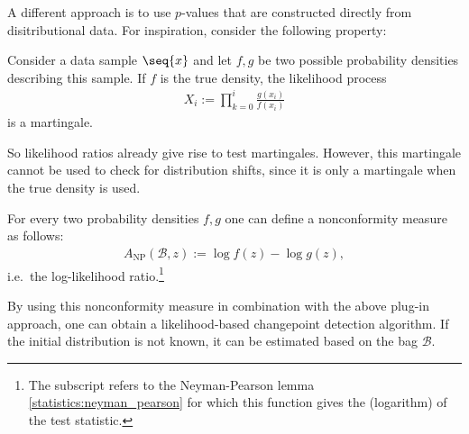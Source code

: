     A different approach is to use $p$-values that are constructed directly from disitributional data. For inspiration, consider the following property:
    \begin{property}
        Consider a data sample $\seq{x}$ and let $f,g$ be two possible probability densities describing this sample. If $f$ is the true density, the likelihood process
        \begin{gather}
            X_i := \prod_{k=0}^i \frac{g(x_i)}{f(x_i)}
        \end{gather}
        is a martingale.
    \end{property}
    So likelihood ratios already give rise to test martingales. However, this martingale cannot be used to check for distribution shifts, since it is only a martingale when the true density is used.
    \begin{example}
        For every two probability densities $f,g$ one can define a nonconformity measure as follows:
        \begin{gather}
            A_\mathrm{NP}(\mathcal{B},z) := \log f(z) - \log g(z),
        \end{gather}
        i.e.~the log-likelihood ratio.\footnote{The subscript refers to the Neyman-Pearson lemma \ref{statistics:neyman_pearson} for which this function gives the (logarithm) of the test statistic.}

        By using this nonconformity measure in combination with the above plug-in approach, one can obtain a likelihood-based changepoint detection algorithm. If the initial distribution is not known, it can be estimated based on the bag $\mathcal{B}$.
    \end{example}